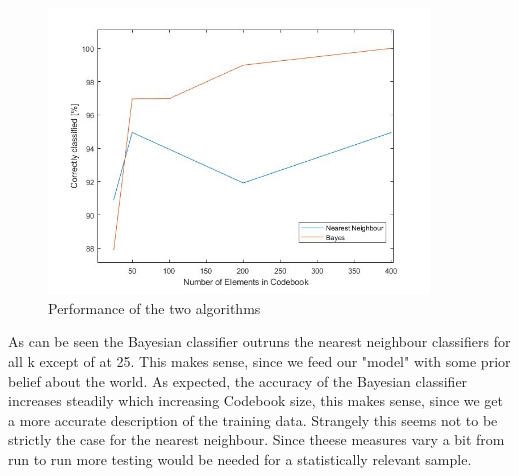 \documentclass[12pt]{article}
\begin{document}
\vspace{5mm}
\begin{figure}[H]
	\centering
	\includegraphics[width=0.9\textwidth]{plot.jpg}
	\caption{Performance of the two algorithms}
	\label{fig1}
\end{figure}
\vspace{5mm}
As can be seen the Bayesian classifier outruns the nearest neighbour classifiers for all k except of at 25. This makes sense, since we feed our "model" with some prior belief about the world. As expected, the accuracy of the Bayesian classifier increases steadily which increasing Codebook size, this makes sense, since we get a more accurate description of the training data. Strangely this seems not to be strictly the case for the nearest neighbour. 
\newline
Since theese measures vary a bit from run to run more testing would be needed for a statistically relevant sample. 
\end{document}

